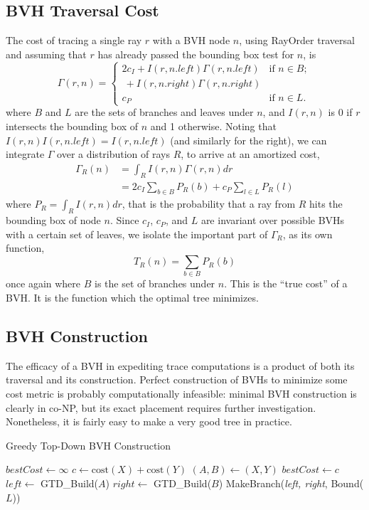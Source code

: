 \documentclass[twocolumn]{article}
\newcommand{\bleft}{\mathit{left}}
\newcommand{\bright}{\mathit{right}}
\begin{document}
\subsection{BVH Traversal Cost}

The cost of tracing a single ray $r$ with a BVH node $n$, using RayOrder traversal and assuming that $r$ has already passed the bounding box test for $n$, is
\[\Gamma(r,n) = \left\{  \begin{array}{ll}
2c_I + I(r,n.\bleft)\Gamma(r,n.\bleft) & \mbox{if $n \in B$}; \\
~+ I(r, n.\bright)\Gamma(r, n.\bright) \\
        c_P & \mbox{if $n \in L$}.
\end{array} \right. \]
where $B$ and $L$ are the sets of branches and leaves under $n$, and $I(r,n)$ is 0 if $r$ intersects the bounding box of $n$ and 1 otherwise.  Noting that $I(r,n)I(r,n.\bleft) = I(r,n.\bleft)$ (and similarly for the right), we can integrate $\Gamma$ over a distribution of rays $R$, to arrive at an amortized cost, 
\begin{align*}
\Gamma_R(n) &=\int_R  I(r,n)\Gamma(r,n)dr \\
&= 2c_I\sum_{b\in B}{P_R(b)} +c_P\sum_{l\in L}{P_R(l)}
\end{align*}
where $P_R = \int_R  I(r,n)dr$, that is the probability that a ray from $R$ hits the bounding box of node $n$.  Since $c_I$, $c_P$, and $L$ are invariant over possible BVHs with a certain set of leaves, we isolate the important part of $\Gamma_R$, as its own function,
\[T_R(n) = \sum_{b\in B}{P_R(b)}\]
once again where $B$ is the set of branches under $n$.  This is the ``true cost'' of a BVH. It is the function which the optimal tree minimizes.
\subsection{BVH Construction}

The efficacy of a BVH in expediting trace computations is a product of both its traversal and its construction.  Perfect construction of BVHs to minimize some cost metric is probably computationally infeasible: minimal BVH construction is clearly in co-NP, but its exact placement requires further investigation.  Nonetheless, it is fairly easy to make a very good tree in practice.  

\begin{algorithm}
\caption{Greedy Top-Down BVH Construction}\label{GTD}
\begin{algorithmic}[1]
	\State $bestCost \gets \infty$
		\State $c \gets \mathrm{cost}(X) +\mathrm{cost}(Y)$
			\State $(A,B) \gets (X,Y)$
			\State $bestCost \gets c$
		\EndIf
	\EndFor
	\State $\mathit{left} \gets$  GTD\_Build($A$)
	\State $right \gets$ GTD\_Build($B$)
	 MakeBranch({\em left, right}, Bound($L$))
\EndProcedure
\end{algorithmic}
\end{algorithm}
\end{document}

